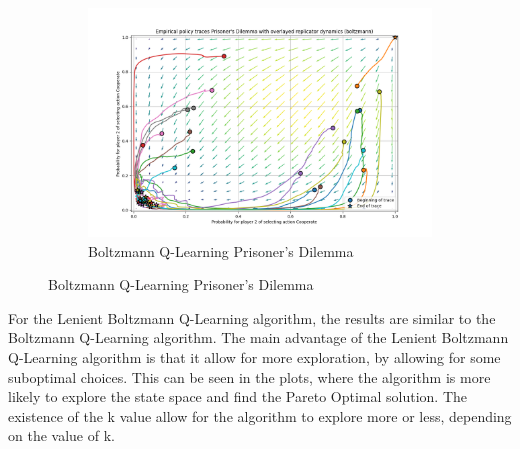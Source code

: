 \documentclass[12pt,letterpaper, onecolumn]{exam}
\begin{document}
\begin{figure}
\begin{subfigure}{.5\textwidth}
      \label{fig:sfigbmp}
    \end{subfigure}%
    \begin{subfigure}{.5\textwidth}
      \centering
      \includegraphics[width=.6\linewidth]{plots/replicator_trajectoreis_Prisoner's Dilemma_boltzmann.png}
      \caption{Boltzmann Q-Learning Prisoner's Dilemma}
      \label{fig:sfigbpd}
    \end{subfigure}%
\end{figure}

For the Lenient Boltzmann Q-Learning algorithm, the results are similar to the Boltzmann Q-Learning algorithm. The main advantage of the Lenient Boltzmann Q-Learning algorithm is that it
allow for more exploration, by allowing for some suboptimal choices. This can be seen in the plots, where the algorithm is more likely to explore the state space and find the Pareto Optimal solution.
The existence of the k value allow for the algorithm to explore more or less, depending on the value of k.
\end{document}
